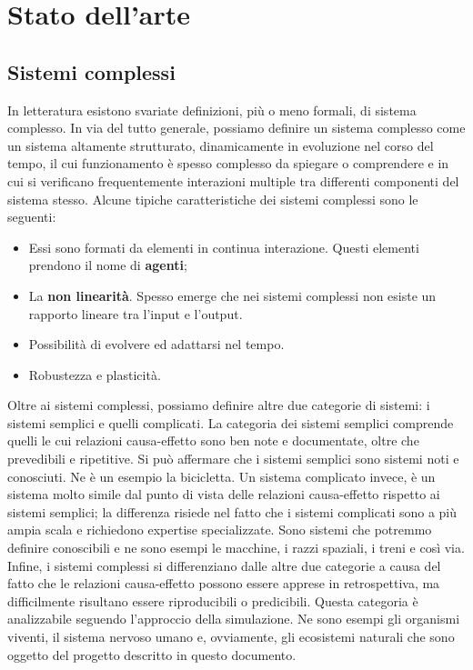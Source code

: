 \documentclass[11pt]{article}
\begin{document}
\section{Stato dell'arte}
\subsection{Sistemi complessi}
In letteratura esistono svariate definizioni, più o meno formali, di sistema complesso. In via del tutto generale, possiamo definire un sistema complesso come un sistema altamente strutturato, dinamicamente in evoluzione nel corso del tempo, il cui funzionamento è spesso complesso da spiegare o comprendere e in cui si verificano frequentemente interazioni multiple tra differenti componenti del sistema stesso. Alcune tipiche caratteristiche dei sistemi complessi sono le seguenti: 
\begin{itemize}
    \item Essi sono formati da elementi in continua interazione. Questi elementi prendono il nome di \textbf{agenti};
    \item La \textbf{non linearità}. Spesso emerge che nei sistemi complessi non esiste un rapporto lineare tra l'input e l'output.
    \item Possibilità di evolvere ed adattarsi nel tempo. 
    \item Robustezza e plasticità. 
\end{itemize}
Oltre ai sistemi complessi, possiamo definire altre due categorie di sistemi: i sistemi semplici e quelli complicati. La categoria dei sistemi semplici comprende quelli le cui relazioni causa-effetto sono ben note e documentate, oltre che prevedibili e ripetitive. Si può affermare che i sistemi semplici sono sistemi noti e conosciuti. Ne è un esempio la bicicletta. Un sistema complicato invece, è un sistema molto simile dal punto di vista delle relazioni causa-effetto rispetto ai sistemi semplici; la differenza risiede nel fatto che i sistemi complicati sono a più ampia scala e richiedono expertise specializzate. Sono sistemi che potremmo definire conoscibili e ne sono esempi le macchine, i razzi spaziali, i treni e così via. Infine, i sistemi complessi si differenziano dalle altre due categorie a causa del fatto che le relazioni causa-effetto possono essere apprese in retrospettiva, ma difficilmente risultano essere riproducibili o predicibili. Questa categoria è analizzabile seguendo l'approccio della simulazione. Ne sono esempi gli organismi viventi, il sistema nervoso umano e, ovviamente, gli ecosistemi naturali che sono oggetto del progetto descritto in questo documento. 
\end{document}
